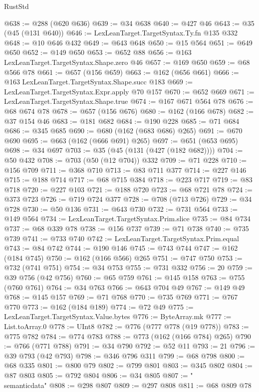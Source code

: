 \begin{lexlean}{RustStd}
\begin{coremodule}
{\begin{coremodule}
{{{{{{{{{{{{{{{{{{{{{{{{{{{{{{{{{{{@638 := @288 (@620 @636)
@639 := @34 @638
@640 := @427 @46
@643 := @35 (@45 (@131 @640))
@646 := LexLeanTarget.TargetSyntax.Ty.fn @135 @332
@648 := @10 @646 @432
@649 := @643 @648
@650 := @15 @564
@651 := @649 @650
@652 := @149 @650
@653 := @652 @88
@656 := @163 LexLeanTarget.TargetSyntax.Shape.zero @46
@657 := @169 @650
@659 := @68 @566 @78
@661 := @657 (@156 @659)
@663 := @162 (@656 @661)
@666 := @163 LexLeanTarget.TargetSyntax.Shape.succ @183
@669 := LexLeanTarget.TargetSyntax.Expr.apply @70 @157
@670 := @652 @669
@671 := LexLeanTarget.TargetSyntax.Shape.true
@674 := @167 @671 @564 @78
@676 := @68 @674 @78
@678 := @657 (@156 @676)
@680 := @162 (@166 @678)
@682 := @37 @154 @46
@683 := @181 @682
@684 := @190 @228
@685 := @71 @684
@686 := @345 @685
@690 := @680 (@162 (@683 @686) @265)
@691 := @670 @690
@695 := @663 (@162 (@666 @691) @265)
@697 := @651 (@653 @695)
@698 := @34 @697
@703 := @35 (@45 (@131 (@427 (@182 @682))))
@704 := @50 @432
@708 := @703 (@50 (@12 @704)) @332
@709 := @71 @228
@710 := @156 @709
@711 := @368 @710
@713 := @83 @711 @377
@714 := @227 @146
@715 := @188 @714
@717 := @68 @715 @384
@718 := @223 @717
@719 := @83 @718
@720 := @227 @103
@721 := @188 @720
@723 := @68 @721 @78
@724 := @373 @723
@726 := @719 @724 @377
@728 := @708 (@713 @726)
@729 := @34 @728
@730 := @50 @136
@731 := @643 @730
@732 := @731 @564
@733 := @149 @564
@734 := LexLeanTarget.TargetSyntax.Prim.slice
@735 := @84 @734
@737 := @68 @339 @78
@738 := @156 @737
@739 := @71 @738
@740 := @735 @739
@741 := @733 @740
@742 := LexLeanTarget.TargetSyntax.Prim.equal
@743 := @84 @742
@744 := @190 @146
@745 := @743 @744
@747 := @162 (@184 @745)
@750 := @162 (@166 @566) @265
@751 := @747 @750
@753 := @732 (@741 @751)
@754 := @34 @753
@755 := @731 @332
@756 := 20
@759 := @39 @756 (@42 @756)
@760 := @65 @759
@761 := @145 @158
@763 := @755 (@760 @761)
@764 := @34 @763
@766 := @643 @704 @49
@767 := @149 @49
@768 := @145 @157
@769 := @71 @768
@770 := @735 @769
@771 := @767 @770
@773 := @162 (@184 @189)
@774 := @72 @49
@775 := LexLeanTarget.TargetSyntax.Value.bytes
@776 := ByteArray.mk
@777 := List.toArray.{0}
@778 := UInt8
@782 := @776 (@777 @778 (@19 @778))
@783 := @775 @782
@784 := @774 @783
@788 := @773 (@162 (@166 @784) @265)
@790 := @766 (@771 @788)
@791 := @34 @790
@792 := @52 @11
@793 := 21
@796 := @39 @793 (@42 @793)
@798 := @346 @796 @311
@799 := @68 @798
@800 := @68 @335
@801 := @800 @79
@802 := @799 @801
@803 := @345 @802
@804 := @87 @803
@805 := @792 @804
@806 := @34 @805
@807 := "\\semanticdata"
@808 := @298 @807
@809 := @297 @808
@811 := @68 @809 @78
}}}}}}}}}}}}}}}}}}}}}}}}}}}}}}}}}}}
\end{coremodule}}
\end{coremodule}
\end{lexlean}
